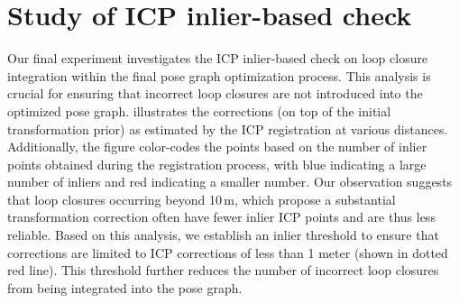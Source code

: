 

\section{Study of ICP inlier-based check}
\label{sec:exp_icp_ablation}

Our final experiment investigates the ICP inlier-based check on loop closure integration within the final pose graph optimization process. This analysis is crucial for ensuring that incorrect loop closures are not introduced into the optimized pose graph.
 illustrates the corrections (on top of the initial transformation prior) as estimated by the ICP registration at various distances. Additionally, the figure color-codes the points based on the number of inlier points obtained during the registration process, with blue indicating a large number of inliers and red indicating a smaller number.
Our observation suggests that loop closures occurring beyond 10\,m, which propose a substantial transformation correction often have fewer inlier ICP points and are thus less reliable.
Based on this analysis, we establish an inlier threshold to ensure that corrections are limited to ICP corrections of less than 1 meter (shown in dotted red line). This threshold further reduces the number of incorrect loop closures from being integrated into the pose graph.



